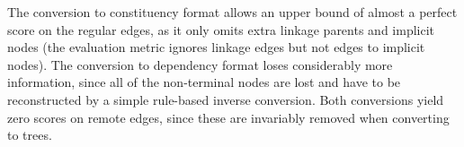 \documentclass[11pt]{article}
\begin{document}

The conversion to constituency format allows an upper bound of almost a perfect score on the
regular edges, as it only omits extra linkage parents and implicit nodes (the evaluation metric ignores linkage edges but not edges to implicit nodes). The conversion to dependency format loses considerably more information, since all of the non-terminal nodes are lost and have to be reconstructed by a simple rule-based inverse conversion.
Both conversions yield zero scores on remote edges, since these are invariably removed when converting to trees.
\end{document}
